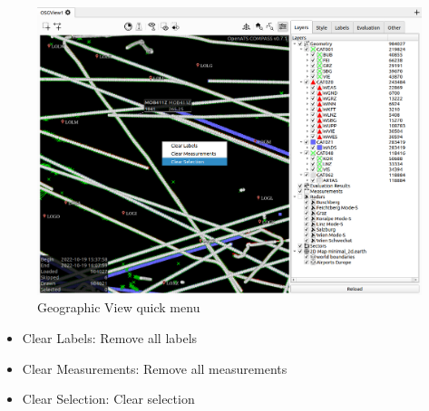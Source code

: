 \begin{figure}[H]
    \hspace*{-2.5cm}
    \includegraphics[width=19cm,frame]{figures/geoview_quick_operations.png}
  \caption{Geographic View quick menu}
\end{figure}

\begin{itemize}
 \item Clear Labels: Remove all labels
 \item Clear Measurements: Remove all measurements
 \item Clear Selection: Clear selection
\end{itemize}


% 
% 
% 


